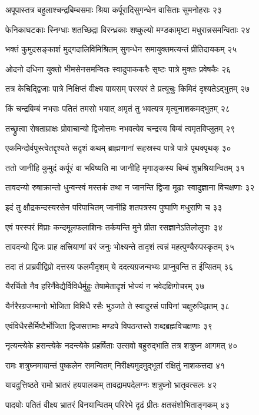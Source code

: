 अपूपास्तत्र बहुलाश्चन्द्रबिम्बसमाः श्रिया
कर्पूरादिसुगन्धेन वासिताः सुमनोहराः २३

फेनिकाघटकाः स्निग्धाः शतच्छिद्रा विरन्ध्रकाः
शष्कुल्यो मण्डकामृष्टा मधुरान्नसमन्विताः २४

भक्तं कुमुदसङ्काशं मुद्गदालिविमिश्रितम्
सुगन्धेन समायुक्तमत्यन्तं प्रीतिदायकम् २५

ओदनो दधिना युक्तो भीमसेनसमन्वितः
स्वादुपाककरैः सृष्टः पात्रे मुक्तः प्रवेषकैः २६

तत्र केचिद्द्विजाः पात्रे निक्षिप्तं वीक्ष्य पायसम्
परस्परं ते प्रत्यूचुः किमिदं दृश्यतेऽद्भुतम् २७

किं चन्द्रबिम्बं नभसः पतितं तमसो भयात्
अमृतं तु भवत्यत्र मृत्युनाशकमद्भुतम् २८

तच्छ्रुत्वा रोषताम्राक्षः प्रोवाचान्यो द्विजोत्तमः
नभवत्येव चन्द्रस्य बिम्बं त्वमृतविप्लुतम् २९

एकमिन्दोर्वपुस्त्वेतद्दृश्यते सदृशं कथम्
ब्राह्मणानां सहस्रस्य पात्रे पात्रे पृथक्पृथक् ३०

ततो जानीहि कुमुदं कर्पूरं वा भविष्यति
मा जानीहि मृगाङ्कस्य बिम्बं शुभ्रश्रियान्वितम् ३१

तावदन्यो रुषाक्रान्तो धुन्वन्स्वं मस्तकं तथा
न जानन्ति द्विजा मूढाः स्वादुज्ञाना विचक्षणाः ३२

इदं तु क्षौद्रकन्दस्यरसेन परिपाचितम्
जानीहि शतपत्रस्य पुष्पाणि मधुराणि च ३३

एवं परस्परं विप्राः कन्दमूलफलाशिनः
तर्कयन्ति मुने प्रीता रसज्ञानेऽतिलोलुपाः ३४

तावदन्यो द्विजः प्राह क्षत्त्रियाणां वरं जनुः
भोक्ष्यन्ते तादृशं त्वन्नं महत्पुण्यैरुपस्कृतम् ३५

तदा तं प्राब्रवीद्विप्रो दत्तस्य फलमीदृशम्
ये ददत्यग्रजन्मभ्यः प्राप्नुवन्ति त ईप्सितम् ३६

यैरर्चितो नैव हरिर्नैवेद्यैर्विविधैर्मुहुः
तेषामेतादृशं भोज्यं न भवेदक्षिगोचरम् ३७

यैर्नरैरग्रजन्मानो भोजिता विविधै रसैः
भुञ्जते ते स्वादुरसं पापिनां चक्षुरुज्झितम् ३८

एवंविधैरसैर्मिष्टैर्भोजिता द्विजसत्तमाः
मण्डपे विपठन्तस्ते शब्दब्रह्मविचक्षणाः ३९

नृत्यन्त्येके हसन्त्येके नदन्त्येके प्रहर्षिताः
उत्सवो बहुरुद्भाति तत्र शत्रुघ्न आगमत् ४०

रामः शत्रुघ्नमायान्तं पुष्कलेन समन्वितम्
निरीक्ष्यमुदमुद्भूतां रक्षितुं नाशकत्तदा ४१

यावदुत्तिष्ठते रामो भ्रातरं हयपालकम्
तावद्रामपदेलग्नः शत्रुघ्नो भ्रातृवत्सलः ४२

पादयोः पतितं वीक्ष्य भ्रातरं विनयान्वितम्
परिरेभे दृढं प्रीतः क्षतसंशोभिताङ्गकम् ४३

